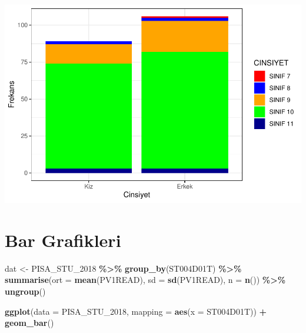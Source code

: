 \documentclass[
  oneside]{book}
\newenvironment{Shaded}{\begin{snugshade}}{\end{snugshade}}
\newcommand{\AttributeTok}[1]{\textcolor[rgb]{0.13,0.29,0.53}{#1}}
\newcommand{\FunctionTok}[1]{\textcolor[rgb]{0.13,0.29,0.53}{\textbf{#1}}}
\newcommand{\NormalTok}[1]{#1}
\newcommand{\OtherTok}[1]{\textcolor[rgb]{0.56,0.35,0.01}{#1}}
\newcommand{\SpecialCharTok}[1]{\textcolor[rgb]{0.81,0.36,0.00}{\textbf{#1}}}
\begin{document}
\begin{center}\includegraphics[width=1\linewidth]{15-betimleyici-istatistik_files/figure-latex/unnamed-chunk-57-1} \end{center}

\hypertarget{bar-grafikleri}{%
\section{Bar Grafikleri}\label{bar-grafikleri}}

\begin{Shaded}
\begin{Highlighting}[]
\NormalTok{dat }\OtherTok{\textless{}{-}}\NormalTok{ PISA\_STU\_2018 }\SpecialCharTok{\%\textgreater{}\%}
  \FunctionTok{group\_by}\NormalTok{(ST004D01T) }\SpecialCharTok{\%\textgreater{}\%}
  \FunctionTok{summarise}\NormalTok{(}\AttributeTok{ort =} \FunctionTok{mean}\NormalTok{(PV1READ),}
            \AttributeTok{sd =} \FunctionTok{sd}\NormalTok{(PV1READ),}
            \AttributeTok{n =} \FunctionTok{n}\NormalTok{()) }\SpecialCharTok{\%\textgreater{}\%}
  \FunctionTok{ungroup}\NormalTok{()}

\FunctionTok{ggplot}\NormalTok{(}\AttributeTok{data =}\NormalTok{ PISA\_STU\_2018, }\AttributeTok{mapping =} \FunctionTok{aes}\NormalTok{(}\AttributeTok{x =}\NormalTok{ ST004D01T)) }\SpecialCharTok{+}
  \FunctionTok{geom\_bar}\NormalTok{()}
\end{Highlighting}
\end{Shaded}
\end{document}
